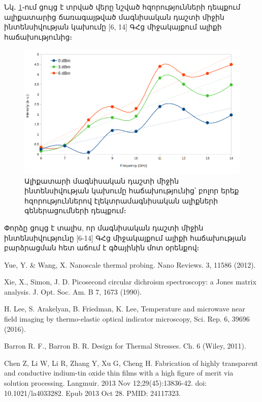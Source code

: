 \documentclass[12pt, fleqn]{report}
\begin{document}
Նկ․ \ref{fig:Int_vs_Freq_0_3_6_dBm}֊ում ցույց է տրված վերը նշված հզորությունների դեպքում ալիքատարից ճառագայթված մագնիսական դաշտի միջին ինտենսիվության կախումը [6, 14] ԳՀց միջակայքում ալիքի հաճախությունից։
\begin{figure}
    \centering
    \includegraphics[width=1.0\textwidth]{data/experiment-results/free_field_of_antenna_6-14GHz_0-6dBm_generator_output_distance_5mm.png}
    \caption{Ալիքատարի մագնիսական դաշտի միջին ինտենսիվության կախումը հաճախությունից՝ բոլոր երեք հզորություններով էլեկտրամագնիսական ալիքների գեներացումների դեպքում։}
    \label{fig:Int_vs_Freq_0_3_6_dBm}
\end{figure}
Փորձը ցույց է տալիս, որ մագնիսական դաշտի միջին ինտենսիվությունը [6-14] ԳՀց միջակայքում ալիքի հաճախության բարձրացման հետ աճում է գծայինին մոտ օրենքով։

\renewcommand{\bibname}{Գրականություն}
\begin{thebibliography}{9}

Yue, Y. \& Wang, X. Nanoscale thermal probing. Nano Reviews. 3, 11586 (2012).

Xie, X., Simon, J. D. Picosecond circular dichroism spectroscopy: a Jones matrix
analysis. J. Opt. Soc. Am. B 7, 1673 (1990).

H. Lee, S. Arakelyan, B. Friedman, K. Lee, Temperature and microwave near field imaging by thermo-elastic optical indicator microscopy, Sci. Rep. 6, 39696 (2016).

 Barron R. F., Barron B. R. Design for Thermal Stresses. Ch. 6 (Wiley, 2011).

 Chen Z, Li W, Li R, Zhang Y, Xu G, Cheng H. Fabrication of highly transparent and conductive indium-tin oxide thin films with a high figure of merit via solution processing. Langmuir. 2013 Nov 12;29(45):13836-42. doi: 10.1021/la4033282. Epub 2013 Oct 28. PMID: 24117323.
\end{thebibliography}


   
\end{document}
